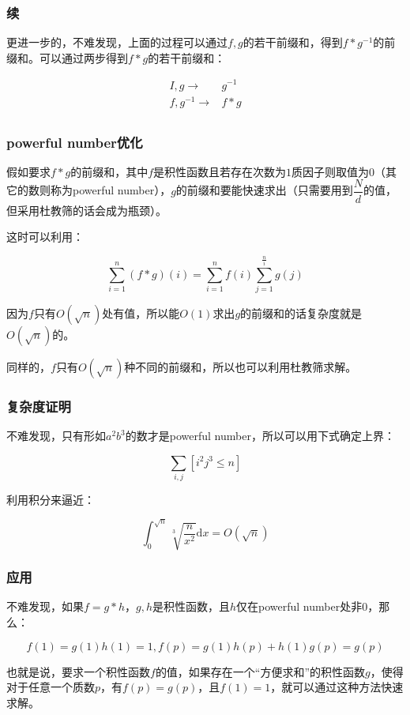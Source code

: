 \documentclass[10pt]{beamer}
\begin{document}
	\begin{frame}
		\frametitle{续}
	
		更进一步的，不难发现，上面的过程可以通过$f,g$的若干前缀和，得到$f*g^{-1}$的前缀和。可以通过两步得到$f*g$的若干前缀和：

		$$
		\begin{aligned}
			I,g\rightarrow &g^{-1}\\
			f,g^{-1}\rightarrow &f*g\\
		\end{aligned}
		$$
	
	\end{frame}
	\begin{frame}
		\frametitle{powerful number优化}
	
		假如要求$f*g$的前缀和，其中$f$是积性函数且若存在次数为$1$质因子则取值为$0$（其它的数则称为powerful number），$g$的前缀和要能快速求出（只需要用到$\dfrac Nd$的值，但采用杜教筛的话会成为瓶颈）。

		这时可以利用：

		$$
		\sum_{i=1}^n (f*g)(i)=\sum_{i=1}^n f(i)\sum_{j=1}^{\frac ni}g(j)
		$$

		因为$f$只有$O(\sqrt n)$处有值，所以能$O(1)$求出$g$的前缀和的话复杂度就是$O(\sqrt n)$的。

		同样的，$f$只有$O(\sqrt n)$种不同的前缀和，所以也可以利用杜教筛求解。
		
	\end{frame}
	\begin{frame}
		\frametitle{复杂度证明}
	
		不难发现，只有形如$a^2b^3$的数才是powerful number，所以可以用下式确定上界：

		$$
		\sum_{i,j}[i^2j^3\le n]
		$$

		利用积分来逼近：

		$$
		\int_{0}^{\sqrt n} \sqrt[3]{\dfrac n{x^2}}\mathrm dx=O(\sqrt n)
		$$
	
	\end{frame}
	\begin{frame}
		\frametitle{应用}
	
		不难发现，如果$f=g*h$，$g,h$是积性函数，且$h$仅在powerful number处非$0$，那么：

		$$
		f(1)=g(1)h(1)=1,f(p)=g(1)h(p)+h(1)g(p)=g(p)
		$$
		
		也就是说，要求一个积性函数$f$的值，如果存在一个“方便求和”的积性函数$g$，使得对于任意一个质数$p$，有$f(p)=g(p)$，且$f(1)=1$，就可以通过这种方法快速求解。
	
	\end{frame}
\end{document}
